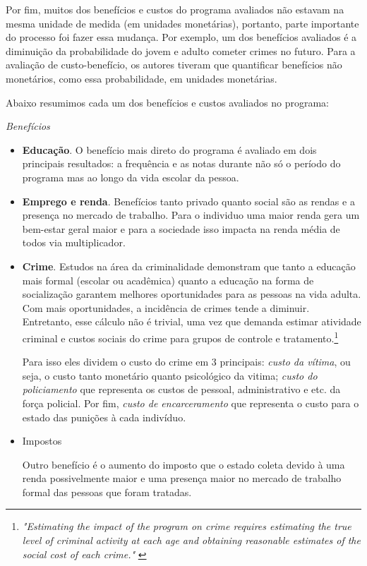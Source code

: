 \documentclass[12pt,letterpaper]{article}
\newcommand{\1}{\mathbbm{1}}
\numberwithin{equation}{section}
\begin{document}
Por fim, muitos dos benefícios e custos do programa avaliados não estavam na mesma unidade de medida (em unidades monetárias), portanto, parte importante do processo foi fazer essa mudança. Por exemplo, um dos benefícios avaliados é a diminuição da probabilidade do jovem e adulto cometer crimes no futuro. Para a avaliação de custo-benefício, os autores tiveram que quantificar benefícios não monetários, como essa probabilidade, em unidades monetárias.

Abaixo resumimos cada um dos benefícios e custos avaliados no programa:

\textit{Benefícios}

\begin{itemize}
    \item \textbf{Educação}. O benefício mais direto do programa é avaliado em dois principais resultados: a frequência e as notas durante não só o período do programa mas ao longo da vida escolar da pessoa.

    \item \textbf{Emprego e renda}. Benefícios tanto privado quanto social são as rendas e a presença no mercado de trabalho. Para o individuo uma maior renda gera um bem-estar geral maior e para a sociedade isso impacta na renda média de todos via multiplicador. 
    
    \item \textbf{Crime}. Estudos na área da criminalidade demonstram que tanto a educação mais formal (escolar ou acadêmica) quanto a educação na forma de socialização garantem melhores oportunidades para as pessoas na vida adulta. Com mais oportunidades, a incidência de crimes tende a diminuir. Entretanto, esse cálculo não é trivial, uma vez que demanda estimar atividade criminal e custos sociais do crime para grupos de controle e tratamento.\footnote{\textit{"Estimating the impact of the program on crime requires estimating the true level of criminal activity at each age and obtaining reasonable estimates of the social cost of each crime."} \cite{heckman2010rate}}

    Para isso eles dividem o custo do crime em 3 principais: \textit{custo da vítima}, ou seja, o custo tanto monetário quanto psicológico da vitima; \textit{custo do policiamento} que representa os custos de pessoal, administrativo e etc. da força policial. Por fim, \textit{custo de encarceramento} que representa o custo para o estado das punições à cada indivíduo.

    \item Impostos

    Outro benefício é o aumento do imposto que o estado coleta devido à uma renda possivelmente maior e uma presença maior no mercado de trabalho formal das pessoas que foram tratadas. 
    
\end{itemize}
\end{document}
